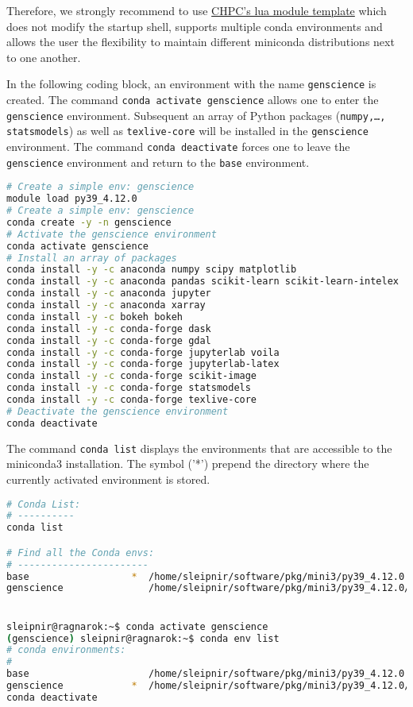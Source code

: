 \documentclass[10pt]{article}
\begin{document}
Therefore, we strongly recommend to use \href{https://github.com/CHPC-UofU/anaconda-modules/blob/master/miniconda3/latest.lua}{CHPC's lua module template}
which does not modify the startup shell, supports multiple conda environments and allows the user the flexibility to maintain different miniconda 
distributions next to one another.

In the following coding block, an environment with the name \texttt{genscience} is created. The command \texttt{conda activate genscience} allows
one to enter the \texttt{genscience} environment. Subsequent an array of Python packages (\texttt{numpy,\ldots, statsmodels}) as well as 
\texttt{texlive-core} will be installed in the \texttt{genscience} environment.
The command \lstinline[language=bash]{conda deactivate} forces one to leave the \texttt{genscience} environment and return to the \texttt{base}
environment.

\begin{lstlisting}[language=bash]
# Create a simple env: genscience
module load py39_4.12.0
# Create a simple env: genscience
conda create -y -n genscience 
# Activate the genscience environment
conda activate genscience
# Install an array of packages
conda install -y -c anaconda numpy scipy matplotlib 
conda install -y -c anaconda pandas scikit-learn scikit-learn-intelex
conda install -y -c anaconda jupyter
conda install -y -c anaconda xarray
conda install -y -c bokeh bokeh
conda install -y -c conda-forge dask
conda install -y -c conda-forge gdal
conda install -y -c conda-forge jupyterlab voila
conda install -y -c conda-forge jupyterlab-latex
conda install -y -c conda-forge scikit-image
conda install -y -c conda-forge statsmodels
conda install -y -c conda-forge texlive-core
# Deactivate the genscience environment
conda deactivate
\end{lstlisting}

The command \texttt{conda list} displays the environments that are accessible to the miniconda3 installation.
The symbol ('*') prepend the directory where the currently activated environment is stored.


\begin{lstlisting}[language=bash]
# Conda List:
# ----------
conda list

# Find all the Conda envs:
# -----------------------
base                  *  /home/sleipnir/software/pkg/mini3/py39_4.12.0
genscience               /home/sleipnir/software/pkg/mini3/py39_4.12.0/envs/genscience


sleipnir@ragnarok:~$ conda activate genscience
(genscience) sleipnir@ragnarok:~$ conda env list
# conda environments:
#
base                     /home/sleipnir/software/pkg/mini3/py39_4.12.0
genscience            *  /home/sleipnir/software/pkg/mini3/py39_4.12.0/envs/genscience
conda deactivate
\end{lstlisting}
\end{document}

